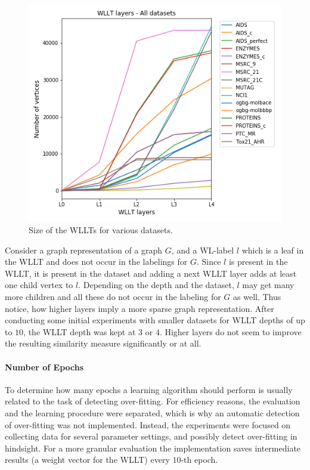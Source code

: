 		\begin{figure}[H]
			\centering
			\includegraphics[width=0.7\linewidth]{images/WLLTstats_AllDs}
			\caption{Size of the WLLTs for various datasets.}
			\label{fig:wlltstatsallds}
		\end{figure}		
		
		Consider a graph representation of a graph $G$, and a WL-label $l$ which is a leaf in the WLLT and does not occur in the labelings for $G$.
		Since $l$ is present in the WLLT, it is present in the dataset and adding a next WLLT layer adds at least one child vertex to $l$.
		Depending on the depth and the dataset, $l$ may get many more children and all these do not occur in the labeling for $G$ as well.
		Thus notice, how higher layers imply a more sparse graph representation.
		After conducting some initial experiments with smaller datasets for WLLT depths of up to $10$, the WLLT depth was kept at $3$ or $4$.
		Higher layers do not seem to improve the resulting similarity measure significantly or at all.
		
		\paragraph{Number of Epochs} To determine how many epochs a learning algorithm should perform is usually related to the task of detecting over-fitting.
		For efficiency reasons, the evaluation and the learning procedure were separated, which is why an automatic detection of over-fitting was not implemented.
		Instead, the experiments were focused on collecting data for several parameter settings, and possibly detect over-fitting in hindsight.
		For a more granular evaluation the implementation saves intermediate results (a weight vector for the WLLT) every $10$-th epoch.
		
